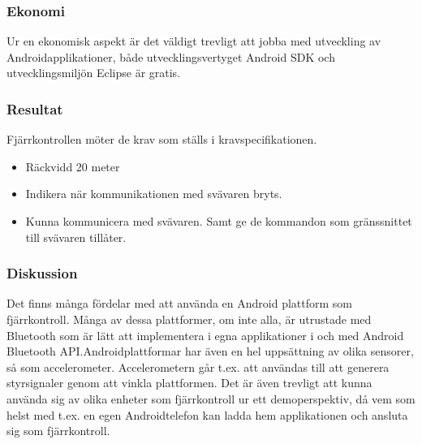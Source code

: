 \subsubsection{Ekonomi}
Ur en ekonomisk aspekt är det väldigt trevligt att jobba med utveckling av Androidapplikationer, både utvecklingsvertyget Android SDK och utvecklingsmiljön Eclipse är gratis.

\subsubsection{Resultat}
Fjärrkontrollen möter de krav som ställs i kravspecifikationen.

\begin {itemize}
\item Räckvidd 20 meter
\item Indikera när kommunikationen med svävaren bryts.
\item Kunna kommunicera med svävaren. Samt ge de kommandon som gränssnittet till svävaren tillåter.
\end {itemize}

\subsubsection{Diskussion}
Det finns många fördelar med att använda en Android plattform som fjärrkontroll. Många av dessa plattformer, om inte alla, är utrustade med Bluetooth som är lätt att implementera i egna applikationer i och med Android Bluetooth API.Androidplattformar har även en hel uppsättning av olika sensorer, så som accelerometer. Accelerometern går t.ex. att användas till att generera styrsignaler genom att vinkla plattformen.
Det är även trevligt att kunna använda sig av olika enheter som fjärrkontroll ur ett demoperspektiv, då vem som helst med t.ex. en egen Androidtelefon kan ladda hem applikationen och ansluta sig som fjärrkontroll. 






